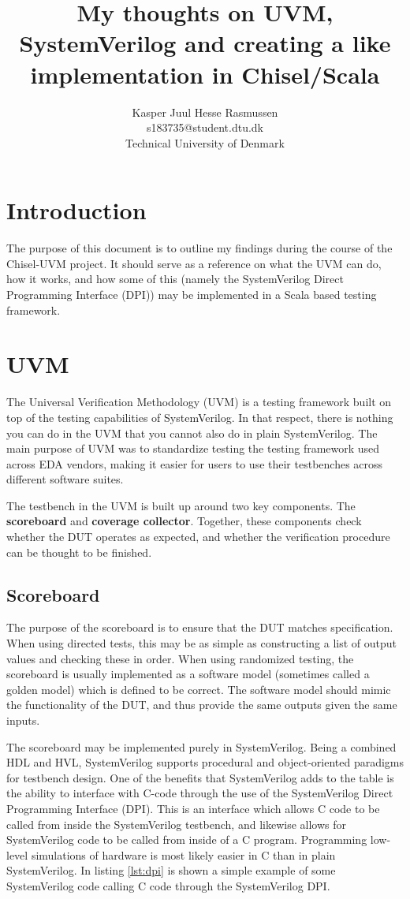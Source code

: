 \documentclass[journal]{IEEEtran}
\title{My thoughts on UVM, SystemVerilog and creating a like implementation in Chisel/Scala}
\author{Kasper Juul Hesse Rasmussen\\
s183735@student.dtu.dk\\
Technical University of Denmark
}
\newcommand{\SV}{SystemVerilog\xspace}
\begin{document}
\maketitle

\section{Introduction}
The purpose of this document is to outline my findings during the course of the Chisel-UVM project. It should serve as a reference on what the UVM can do, how it works, and how some of this (namely the SystemVerilog Direct Programming Interface (DPI)) may be implemented in a Scala based testing framework.

\section{UVM}
The Universal Verification Methodology (UVM) is a testing framework built on top of the testing capabilities of SystemVerilog. In that respect, there is nothing you can do in the UVM that you cannot also do in plain SystemVerilog. The main purpose of UVM was to standardize testing the testing framework used across EDA vendors, making it easier for users to use their testbenches across different software suites.

The testbench in the UVM is built up around two key components. The \textbf{scoreboard} and \textbf{coverage collector}. Together, these components check whether the DUT operates as expected, and whether the verification procedure can be thought to be finished.

\subsection{Scoreboard}
The purpose of the scoreboard is to ensure that the DUT matches specification. When using directed tests, this may be as simple as constructing a list of output values and checking these in order. When using randomized testing, the scoreboard is usually implemented as a software model (sometimes called a golden model) which is defined to be correct. The software model should mimic the functionality of the DUT, and thus provide the same outputs given the same inputs. 

The scoreboard may be implemented purely in SystemVerilog. Being a combined HDL and HVL, SystemVerilog supports procedural and object-oriented paradigms for testbench design. One of the benefits that \SV adds to the table is the ability to interface with C-code through the use of the \SV Direct Programming Interface (DPI). This is an interface which allows C code to be called from inside the \SV testbench, and likewise allows for \SV code to be called from inside of a C program. Programming low-level simulations of hardware is most likely easier in C than in plain \SV. In listing \ref{lst:dpi} is shown a simple example of some SystemVerilog code calling C code through the \SV DPI.
\end{document}
